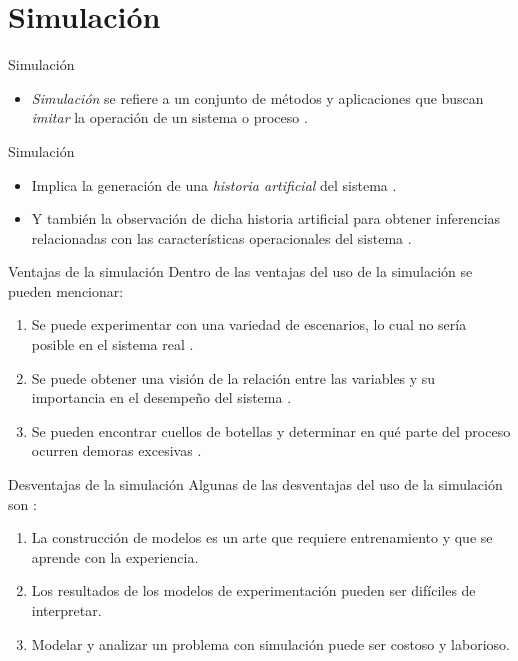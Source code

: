 \section{Simulación}

\begin{frame}{Simulación}
    \begin{itemize}
        \item \textit{Simulación} se refiere a un conjunto de métodos y aplicaciones que buscan \textit{imitar} la operación de un sistema o proceso \cite{BCN,KSS}.
    \end{itemize}
\end{frame}

\begin{frame}{Simulación}
    \begin{itemize}
        \item Implica la generación de una \textit{historia artificial} del sistema \cite{BCN}.
        \item Y también la observación de dicha historia artificial para obtener inferencias relacionadas con las características operacionales del sistema \cite{BCN}.
    \end{itemize}
\end{frame}

\begin{frame}{Ventajas de la simulación}
    Dentro de las ventajas del uso de la simulación se pueden mencionar: 
    \begin{enumerate}
        \item Se puede experimentar con una variedad de escenarios, lo cual no sería posible en el sistema real \cite{KSS}.
        \item Se puede obtener una visión de la relación entre las variables y su importancia en el desempeño del sistema  \cite{BCN}.
        \item Se pueden encontrar cuellos de botellas y determinar en qué parte del proceso ocurren demoras excesivas  \cite{BCN}.
    \end{enumerate}
\end{frame}

\begin{frame}{Desventajas de la simulación}
    Algunas de las desventajas del uso de la simulación son \cite{BCN}: 
    \begin{enumerate}
        \item La construcción de modelos es un arte que requiere entrenamiento y que se aprende con la experiencia.
        \item Los resultados de los modelos de experimentación pueden ser difíciles de interpretar.
        \item Modelar y analizar un problema con simulación puede ser costoso y laborioso.
    \end{enumerate}
\end{frame}